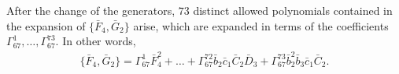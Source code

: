 \documentclass[10pt]{amsart}
\theoremstyle{definition}
\theoremstyle{corollary}
\theoremstyle{remark}
\theoremstyle{conclusion}
\begin{document}
After the change of the generators, $73$ distinct allowed polynomials contained in the expansion of $  \{\bar{F}_4,\bar{G}_2\}$ arise, which are expanded in terms of the coefficients $\Gamma_{67}^1,\ldots,\Gamma_{67}^{73}.$ In other words, \begin{align*}
    \{\bar{F}_4,\bar{G}_2\} = \Gamma_{67}^1 \bar{F}_4^2 + \ldots +\Gamma_{67}^{72} \bar{b}_2\bar{c}_1\bar{C}_2\bar{D}_3 +  \Gamma_{67}^{73} \bar{b}_2^2 \bar{b}_3 \bar{c}_1 \bar{C}_2.
\end{align*} %
\end{document}
